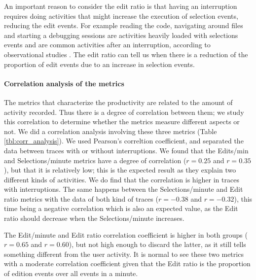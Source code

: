 \documentclass[times]{smrauth}
\newcommand\RR[1]{\textbf{Romain #1}}
\begin{document}


An important reason to consider the edit ratio is that having an interruption requires doing activities that might increase the execution of selection events, reducing the edit events. For example reading the code, navigating around files and starting a debugging sessions are activities heavily loaded with selections events and are common activities after an interruption, according to observational studies \cite{PR11,PD10}. The edit ratio can tell us when there is a reduction of the proportion of edit events due to an increase in selection events.


\paragraph{Correlation analysis of the metrics}

The metrics that characterize the productivity are related to the amount of activity recorded. Thus there is a degree of correlation between them; we study this correlation to determine whether the metrics measure different aspects or not.  %
We did a correlation analysis involving these three metrics (Table \ref{tbl:corr_analysis}). We used Pearson's correltion coefficient, and separated the data between traces with or without interruptions. We found that the Edits/min and Selections/minute metrics have a degree of correlation ($r=0.25$ and $r=0.35$), but that it is relatively low; this is the expected result as they explain two different kinds of activities. We do find that the correlation is higher in traces with interruptions. The same happens between the Selections/minute and Edit ratio metrics with the data of both kind of traces ($r=-0.38$ and $r=-0.32$), this time being a negative correlation which is also an expected value, as the Edit ratio should decrease when the Selections/minute increases. 

The Edit/minute and Edit ratio correlation coefficient is higher in both groups ($r=0.65$ and $r=0.60$), but not high enough to discard the latter, as it still tells something different from the user activity. It is normal to see these two metrics with a moderate correlation coefficient given that the Edit ratio is the proportion of edition events over all events in a minute.
\end{document}
